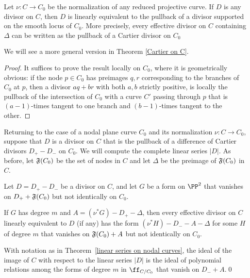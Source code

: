 \begin{lemma}
Let $\nu: C\to C_{0}$ be the normalization of any reduced projective curve. If $D$ is any divisor
on $C$, then $D$ is linearly equivalent to the pullback of a divisor supported on the smooth locus of  $C_{0}$. More precisely,  every effective divisor on $C$ containing $\Delta$ can be written as the pullback
of a Cartier divisor on $C_{0}$\end{lemma}

We will see a more general version in Theorem \ref{Cartier on C}.

\begin{proof}
It suffices to prove the result locally on $C_{0}$, where it is geometrically obvious:  if the node
$p\in C_{0}$ has preimages $q,r$ corresponding to the branches of $C_{0}$ at $p$, then
a divisor $aq+br$ with both $a,b$ strictly positive, is locally the pullback of the intersection of $C_{0}$
with a curve $C'$ passing through $p$  that is $(a-1)$-times tangent to one branch and
$(b-1)$-times tangent to the other.
\end{proof}


Returning to the case of a nodal plane curve $C_{0}$ and its normalization $\nu: C\to C_{0}$,
suppose that $D$ is a divisor on $C$ that is the pullback of a difference of Cartier
divisors $D_{+}-D_{-}$ on $C_{0}$. We will compute the complete linear series $|D|$.
As before, let $\adj(C_{0})$ be the set of nodes in $C$ and let $\Delta$ be the preimage of $\adj(C_{0})$ in $C$.

\begin{theorem}\label{linear series on nodal curves}
Let $D = D_{+}-D_{-}$ be a divisor on $C$, and let $G$ be a form on $\PP^{2}$ 
that vanishes on  $D_{+}+\adj(C_{0})$ but not identically on $C_{0}$.

If $G$ has degree $m$ and $A = (\nu^{*}G)-D_{+}-\Delta$, then every effective divisor on
$C$ linearly equivalent to $D$ (if any) has the form $(\nu^*H)-D_{-}-A-\Delta$ for some $H$ of degree $m$
that vanishes on $\adj(C_{0})+A$ but not identically on $C_{0}$.
\end{theorem}

\begin{corollary}
With notation as in Theorem~\ref{linear series on nodal curves}, the ideal of the image of
$C$ with respect to the linear series $|D|$ is the ideal of polynomial relations among the forms
of degree $m$ in $\ff_{C/C_{0}}$ that vanish on $D_{-}+ A$.\qed
\end{corollary}

